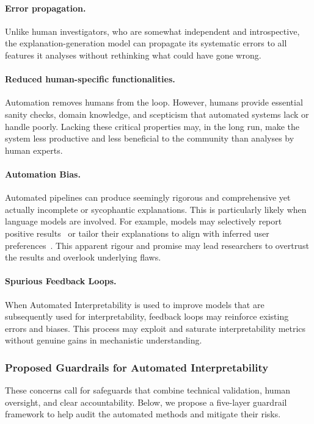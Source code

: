 \begin{warningbox}
\paragraph{Error propagation.} Unlike human investigators, who are somewhat independent and introspective, the explanation-generation model can propagate its systematic errors to all features it analyses without rethinking what could have gone wrong.\\

\paragraph{Reduced human-specific functionalities.} Automation removes humans from the loop. However, humans provide essential sanity checks, domain knowledge, and scepticism that automated systems lack or handle poorly. Lacking these critical properties may, in the long run, make the system less productive and less beneficial to the community than analyses by human experts.\\

\paragraph{Automation Bias.} Automated pipelines can produce seemingly rigorous and comprehensive yet actually incomplete or sycophantic explanations. This is particularly likely when language models are involved. For example, models may selectively report positive results~ or tailor their explanations to align with inferred user preferences~. This apparent rigour and promise may lead researchers to overtrust the results and overlook underlying flaws.\\

\paragraph{Spurious Feedback Loops.} When Automated Interpretability is used to improve models that are subsequently used for interpretability, feedback loops may reinforce existing errors and biases. This process may exploit and saturate interpretability metrics without genuine gains in mechanistic understanding.

\end{warningbox}

\subsubsection{Proposed Guardrails for Automated Interpretability}
These concerns call for safeguards that combine technical validation, human oversight, and clear accountability. Below, we propose a five-layer guardrail framework to help audit the automated methods and mitigate their risks.


